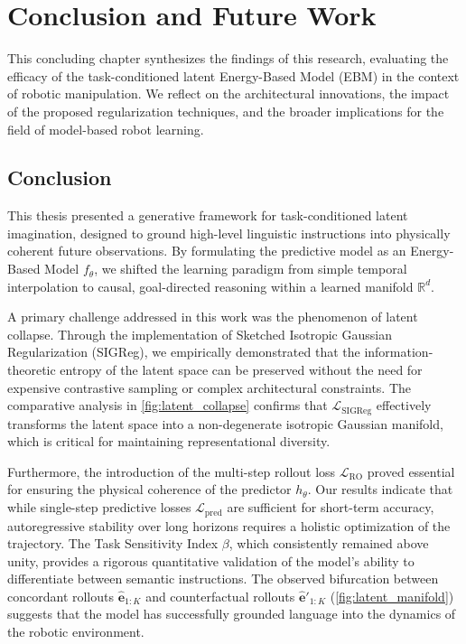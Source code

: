 \chapter{Conclusion and Future Work}
\label{sec:conclusion}

This concluding chapter synthesizes the findings of this research, evaluating the efficacy of the task-conditioned latent Energy-Based Model (EBM) in the context of robotic manipulation. We reflect on the architectural innovations, the impact of the proposed regularization techniques, and the broader implications for the field of model-based robot learning.

\section{Conclusion}

This thesis presented a generative framework for task-conditioned latent imagination, designed to ground high-level linguistic instructions into physically coherent future observations. By formulating the predictive model as an Energy-Based Model $f_\theta$, we shifted the learning paradigm from simple temporal interpolation to causal, goal-directed reasoning within a learned manifold $\mathbb{R}^d$.

A primary challenge addressed in this work was the phenomenon of latent collapse. Through the implementation of Sketched Isotropic Gaussian Regularization (SIGReg), we empirically demonstrated that the information-theoretic entropy of the latent space can be preserved without the need for expensive contrastive sampling or complex architectural constraints. The comparative analysis in \cref{fig:latent_collapse} confirms that $\mathcal{L}_{\mathrm{SIGReg}}$ effectively transforms the latent space into a non-degenerate isotropic Gaussian manifold, which is critical for maintaining representational diversity.

Furthermore, the introduction of the multi-step rollout loss $\mathcal{L}_{\mathrm{RO}}$ proved essential for ensuring the physical coherence of the predictor $h_\theta$. Our results indicate that while single-step predictive losses $\mathcal{L}_{\mathrm{pred}}$ are sufficient for short-term accuracy, autoregressive stability over long horizons requires a holistic optimization of the trajectory. The Task Sensitivity Index $\beta$, which consistently remained above unity, provides a rigorous quantitative validation of the model's ability to differentiate between semantic instructions. The observed bifurcation between concordant rollouts $\hat{\mathbf{e}}_{1:K}$ and counterfactual rollouts $\hat{\mathbf{e}}'_{1:K}$ (\cref{fig:latent_manifold}) suggests that the model has successfully grounded language into the dynamics of the robotic environment.

